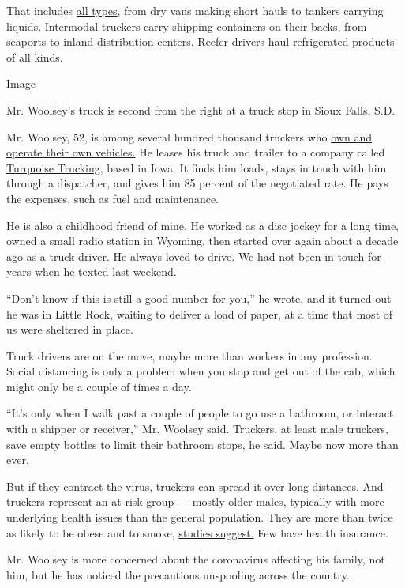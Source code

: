 That includes \href{http://www.alltrucking.com/faq/truck-job-types/}{all
types}, from dry vans making short hauls to tankers carrying liquids.
Intermodal truckers carry shipping containers on their backs, from
seaports to inland distribution centers. Reefer drivers haul
refrigerated products of all kinds.

Image

Mr. Woolsey's truck is second from the right at a truck stop in Sioux
Falls, S.D.

Mr. Woolsey, 52, is among several hundred thousand truckers who
\href{https://www.ooida.com/MediaCenter/trucking-facts.asp}{own and
operate their own vehicles.} He leases his truck and trailer to a
company called \href{https://turquoisetruck.com/}{Turquoise Trucking},
based in Iowa. It finds him loads, stays in touch with him through a
dispatcher, and gives him 85 percent of the negotiated rate. He pays the
expenses, such as fuel and maintenance.

He is also a childhood friend of mine. He worked as a disc jockey for a
long time, owned a small radio station in Wyoming, then started over
again about a decade ago as a truck driver. He always loved to drive. We
had not been in touch for years when he texted last weekend.

``Don't know if this is still a good number for you,'' he wrote, and it
turned out he was in Little Rock, waiting to deliver a load of paper, at
a time that most of us were sheltered in place.

Truck drivers are on the move, maybe more than workers in any
profession. Social distancing is only a problem when you stop and get
out of the cab, which might only be a couple of times a day.

``It's only when I walk past a couple of people to go use a bathroom, or
interact with a shipper or receiver,'' Mr. Woolsey said. Truckers, at
least male truckers, save empty bottles to limit their bathroom stops,
he said. Maybe now more than ever.

But if they contract the virus, truckers can spread it over long
distances. And truckers represent an at-risk group --- mostly older
males, typically with more underlying health issues than the general
population. They are more than twice as likely to be obese and to smoke,
\href{https://www.ncbi.nlm.nih.gov/pmc/articles/PMC4511102/}{studies
suggest.} Few have health insurance.

Mr. Woolsey is more concerned about the coronavirus affecting his
family, not him, but he has noticed the precautions unspooling across
the country.

